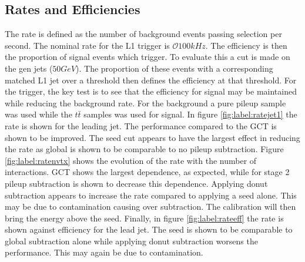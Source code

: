 \subsection{Rates and Efficiencies}
The rate is defined as the number of background events passing selection per second. The nominal rate for the L1 trigger is $\mathcal{O}100kHz$. The efficiency is then the proportion of signal events which trigger. To evaluate this a cut is made on the gen jets ($50GeV$). The proportion of these events with a corresponding matched L1 jet over a threshold then defines the efficiency at that threshold.  For the trigger, the key test is to see that the efficiency for signal may be maintained while reducing the background rate. For the background a pure pileup sample was used while the $t\bar{t}$ samples was used for signal. In figure \ref{fig:label:ratejet1} the rate is shown for the leading jet. The performance compared to the GCT is shown to be improved. The seed cut appears to have the largest effect in reducing the rate as global is shown to be comparable to no pileup subtraction. Figure \ref{fig:label:ratenvtx} shows the evolution of the rate with the number of interactions. GCT shows the largest dependence, as expected, while for stage 2 pileup subtraction is shown to decrease this dependence. Applying donut subtraction appears to increase the rate compared to applying a seed alone. This may be due to contamination causing over subtraction. The calibration will then bring the energy above the seed. Finally, in figure \ref{fig:label:rateeff} the rate is shown against efficiency for the lead jet. The seed is shown to be comparable to global subtraction alone while applying donut subtraction worsens the performance. This may again be due to contamination.

